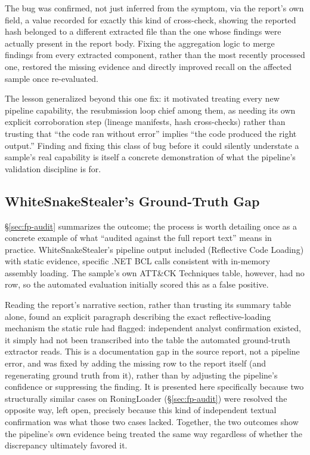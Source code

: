 The bug was confirmed, not just inferred from the symptom, via the
report's own  field, a value recorded for exactly
this kind of cross-check, showing the reported hash belonged to a
different extracted file than the one whose findings were actually
present in the report body. Fixing the aggregation logic to merge
findings from every extracted component, rather than the most recently
processed one, restored the missing evidence and directly improved
recall on the affected sample once re-evaluated.

The lesson generalized beyond this one fix: it motivated treating every
new pipeline capability, the resubmission loop chief among them, as
needing its own explicit corroboration step (lineage manifests, hash
cross-checks) rather than trusting that ``the code ran without error''
implies ``the code produced the right output.'' Finding and fixing this
class of bug before it could silently understate a sample's real
capability is itself a concrete demonstration of what the pipeline's
validation discipline is for.

\subsection{WhiteSnakeStealer's Ground-Truth Gap}
\label{sec:case-wsnake}

\S\ref{sec:fp-audit} summarizes the outcome; the process is worth
detailing once as a concrete example of what ``audited against the full
report text'' means in practice. WhiteSnakeStealer's pipeline output
included  (Reflective Code Loading) with static
evidence, specific .NET BCL calls consistent with in-memory assembly
loading. The sample's own ATT\&CK Techniques table, however, had no
 row, so the automated evaluation initially scored
this as a false positive.

Reading the report's narrative section, rather than trusting its
summary table alone, found an explicit paragraph describing the exact
reflective-loading mechanism the static rule had flagged: independent
analyst confirmation existed, it simply had not been transcribed into
the table the automated ground-truth extractor reads. This is a
documentation gap in the source report, not a pipeline error, and was
fixed by adding the missing row to the report itself (and regenerating
ground truth from it), rather than by adjusting the pipeline's
confidence or suppressing the finding. It is presented here
specifically because two structurally similar cases on RoningLoader
(\S\ref{sec:fp-audit}) were resolved the opposite way, left open,
precisely because this kind of independent textual confirmation was
what those two cases lacked. Together, the two outcomes show the
pipeline's own evidence being treated the same way regardless of
whether the discrepancy ultimately favored it.

